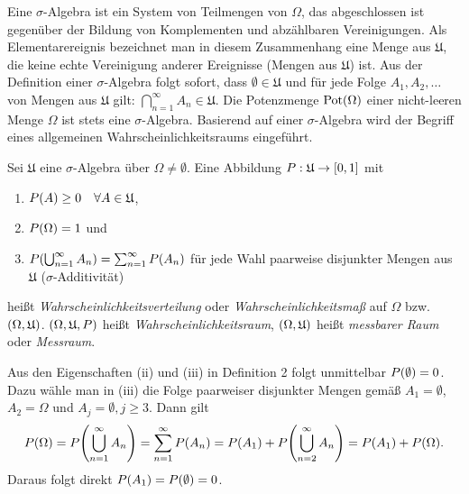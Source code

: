 \documentclass{lecture}
\begin{document}
    Eine \(\sigma\)-Algebra ist ein System von Teilmengen von \(\Omega\), das abgeschlossen ist gegenüber der Bildung von Komplementen und abzählbaren Vereinigungen.
    Als Elementarereignis bezeichnet man in diesem Zusammenhang eine Menge aus \(\mathfrak{U}\), die keine echte Vereinigung anderer Ereignisse (Mengen aus \(\mathfrak{U}\)) ist.
    Aus der Definition einer \(\sigma\)-Algebra folgt sofort, dass \(\emptyset \in \mathfrak{U}\) und für jede Folge \(A_1, A_2, \ldots\) von Mengen aus \(\mathfrak{U}\) gilt: \(\bigcap_{n = 1}^\infty A_n \in \mathfrak{U}\).
    Die Potenzmenge \(\Pot\parentheses*{\Omega}\) einer nicht-leeren Menge \(\Omega\) ist stets eine \(\sigma\)-Algebra.
    Basierend auf einer \(\sigma\)-Algebra wird der Begriff eines allgemeinen Wahrscheinlichkeitsraums eingeführt.

    \begin{definition}
        Sei \(\mathfrak{U}\) eine \(\sigma\)-Algebra über \(\Omega \ne \emptyset\).
        Eine Abbildung \(P: \mathfrak{U} \to \brackets*{0, 1}\) mit
        \begin{enumerate}
            \item \(P\parentheses*{A} \ge 0 \quad \forall A \in \mathfrak{U}\),
            \item \(P\parentheses*{\Omega} = 1\) und
            \item \(P\parentheses*{\bigcup_{n = 1}^\infty A_n} = \sum_{n = 1}^\infty P\parentheses*{A_n}\) für jede Wahl paarweise disjunkter Mengen aus \(\mathfrak{U}\) (\(\sigma\)-Additivität)
        \end{enumerate}
        heißt \emph{Wahrscheinlichkeitsverteilung} oder \emph{Wahrscheinlichkeitsmaß} auf \(\Omega\) bzw. \(\parentheses*{\Omega, \mathfrak{U}}\).
        \(\parentheses*{\Omega, \mathfrak{U}, P}\) heißt \emph{Wahrscheinlichkeitsraum}, \(\parentheses*{\Omega, \mathfrak{U}}\) heißt \emph{messbarer Raum} oder \emph{Messraum}.
    \end{definition}

    Aus den Eigenschaften (ii) und (iii) in Definition 2 folgt unmittelbar \(P\parentheses*{\emptyset} = 0\).
    Dazu wähle man in (iii) die Folge paarweiser disjunkter Mengen gemäß \(A_1 = \emptyset\), \(A_2 = \Omega\) und \(A_j = \emptyset, j \ge 3\).
    Dann gilt
    \[
        P\parentheses*{\Omega} = P\parentheses*{\bigcup_{n = 1}^\infty A_n} = \sum_{n = 1}^\infty P\parentheses*{A_n} = P\parentheses*{A_1} + P\parentheses*{\bigcup_{n = 2}^\infty A_n} = P\parentheses*{A_1} + P\parentheses*{\Omega}.
    \]
    Daraus folgt direkt \(P\parentheses*{A_1} = P\parentheses*{\emptyset} = 0\).
\end{document}
